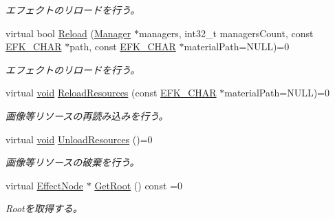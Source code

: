 \begin{DoxyCompactItemize}
\begin{DoxyCompactList}\small\item\em エフェクトのリロードを行う。 \end{DoxyCompactList}\item 
virtual bool \mbox{\hyperlink{class_effekseer_1_1_effect_aa3b78b38874183e8d9c52c03b791a691}{Reload}} (\mbox{\hyperlink{class_effekseer_1_1_manager}{Manager}} $\ast$managers, int32\+\_\+t managers\+Count, const \mbox{\hyperlink{_effekseer_8h_aca7eb5de6dd019c19ac58ea35a193f2f}{E\+F\+K\+\_\+\+C\+H\+AR}} $\ast$path, const \mbox{\hyperlink{_effekseer_8h_aca7eb5de6dd019c19ac58ea35a193f2f}{E\+F\+K\+\_\+\+C\+H\+AR}} $\ast$material\+Path=N\+U\+LL)=0
\begin{DoxyCompactList}\small\item\em エフェクトのリロードを行う。 \end{DoxyCompactList}\item 
virtual \mbox{\hyperlink{namespace_effekseer_ab34c4088e512200cf4c2716f168deb56}{void}} \mbox{\hyperlink{class_effekseer_1_1_effect_ae5c311df731ae2009aaee1bc8e6e98a3}{Reload\+Resources}} (const \mbox{\hyperlink{_effekseer_8h_aca7eb5de6dd019c19ac58ea35a193f2f}{E\+F\+K\+\_\+\+C\+H\+AR}} $\ast$material\+Path=N\+U\+LL)=0
\begin{DoxyCompactList}\small\item\em 画像等リソースの再読み込みを行う。 \end{DoxyCompactList}\item 
virtual \mbox{\hyperlink{namespace_effekseer_ab34c4088e512200cf4c2716f168deb56}{void}} \mbox{\hyperlink{class_effekseer_1_1_effect_a5ed461f5a30a4282db026b500f9967dc}{Unload\+Resources}} ()=0
\begin{DoxyCompactList}\small\item\em 画像等リソースの破棄を行う。 \end{DoxyCompactList}\item 
virtual \mbox{\hyperlink{class_effekseer_1_1_effect_node}{Effect\+Node}} $\ast$ \mbox{\hyperlink{class_effekseer_1_1_effect_ad1b5285e9df73c44cb132d07b116d994}{Get\+Root}} () const =0
\begin{DoxyCompactList}\small\item\em Rootを取得する。 \end{DoxyCompactList}\end{DoxyCompactItemize}

